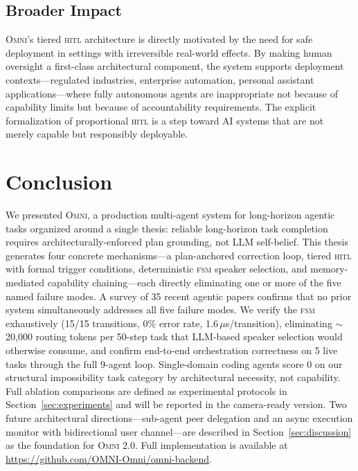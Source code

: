 \documentclass[11pt,a4paper]{article}
\newcommand{\omni}{\textsc{Omni}}
\newcommand{\hitl}{\textsc{hitl}}
\newcommand{\fsm}{\textsc{fsm}}
\begin{document}
\subsection{Broader Impact}

\omni{}'s tiered \hitl{} architecture is directly motivated by the need for safe deployment in settings with irreversible real-world effects. By making human oversight a first-class architectural component, the system supports deployment contexts---regulated industries, enterprise automation, personal assistant applications---where fully autonomous agents are inappropriate not because of capability limits but because of accountability requirements. The explicit formalization of proportional \hitl{} is a step toward AI systems that are not merely capable but responsibly deployable.

\section{Conclusion}
\label{sec:conclusion}

We presented \omni{}, a production multi-agent system for long-horizon agentic tasks organized around a single thesis: reliable long-horizon task completion requires architecturally-enforced plan grounding, not LLM self-belief. This thesis generates four concrete mechanisms---a plan-anchored correction loop, tiered \hitl{} with formal trigger conditions, deterministic \fsm{} speaker selection, and memory-mediated capability chaining---each directly eliminating one or more of the five named failure modes. A survey of 35 recent agentic papers confirms that no prior system simultaneously addresses all five failure modes. We verify the \fsm{} exhaustively (15/15 transitions, 0\% error rate, 1.6\,$\mu$s/transition), eliminating $\sim$20{,}000 routing tokens per 50-step task that LLM-based speaker selection would otherwise consume, and confirm end-to-end orchestration correctness on 5 live tasks through the full 9-agent loop. Single-domain coding agents score 0 on our structural impossibility task category by architectural necessity, not capability. Full ablation comparisons are defined as experimental protocols in Section~\ref{sec:experiments} and will be reported in the camera-ready version. Two future architectural directions---sub-agent peer delegation and an async execution monitor with bidirectional user channel---are described in Section~\ref{sec:discussion} as the foundation for \omni{} 2.0. Full implementation is available at \url{https://github.com/OMNI-Omni/omni-backend}.
\end{document}
